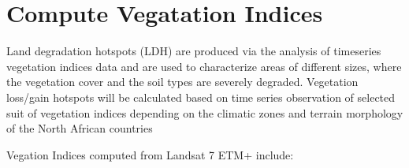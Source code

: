 \documentclass[letterpaper,10pt,english]{sphinxmanual}
\begin{document}
\section{Compute Vegatation Indices}
\label{\detokenize{Qgis_Plugin/Calculate_vegetation:compute-vegatation-indices}}


\sphinxAtStartPar
Land degradation hotspots (LDH) are produced via the analysis of time\sphinxhyphen{}series
vegetation indices data and are used to characterize areas of different sizes,
where the vegetation cover and the soil types are severely degraded. Vegetation
loss/gain hotspots will be calculated based on time series observation of selected
suit of vegetation indices depending on the climatic zones and terrain morphology
of the North African countries

\sphinxAtStartPar
Vegation Indices computed from Landsat 7 ETM+ include:
\end{document}
